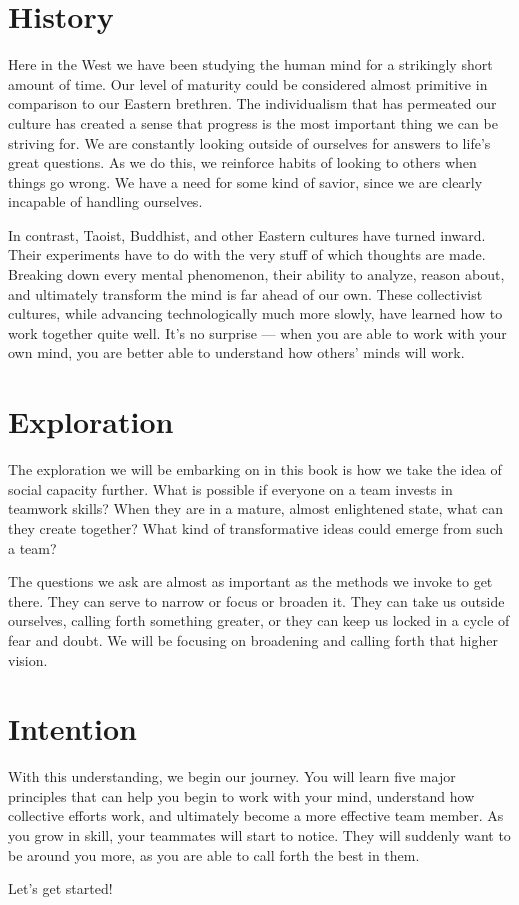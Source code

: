 \section{History}

Here in the West we have been studying the human mind for a strikingly short amount of time. Our
level of maturity could be considered almost primitive in comparison to our Eastern brethren. The
individualism that has permeated our culture has created a sense that progress is the most important
thing we can be striving for. We are constantly looking outside of ourselves for answers to life's 
great questions. As we do this, we reinforce habits of looking to others when things go wrong. We
have a need for some kind of savior, since we are clearly incapable of handling ourselves.

In contrast, Taoist, Buddhist, and other Eastern cultures have turned inward. Their experiments have
to do with the very stuff of which thoughts are made. Breaking down every mental phenomenon, their 
ability to analyze, reason about, and ultimately transform the mind is far ahead of our own. These
collectivist cultures, while advancing technologically much more slowly, have learned how to work 
together quite well. It's no surprise --- when you are able to work with your own mind, you 
are better able to understand how others' minds will work.

\section{Exploration}

The exploration we will be embarking on in this book is how we take the idea of social capacity 
further. What is possible if everyone on a team invests in teamwork skills? When they are in a mature, almost 
enlightened state, what can they create together? What kind of transformative ideas could emerge from 
such a team?

The questions we ask are almost as important as the methods we invoke to get there. They can serve
to narrow or focus or broaden it. They can take us outside ourselves, calling forth something greater, or
they can keep us locked in a cycle of fear and doubt. We will be focusing on broadening and calling
forth that higher vision.

\section{Intention}

With this understanding, we begin our journey. You will learn five major principles that can help
you begin to work with your mind, understand how collective efforts work, and ultimately become
a more effective team member. As you grow in skill, your teammates will start to notice. They will 
suddenly want to be around you more, as you are able to call forth the best in them.

Let's get started! 